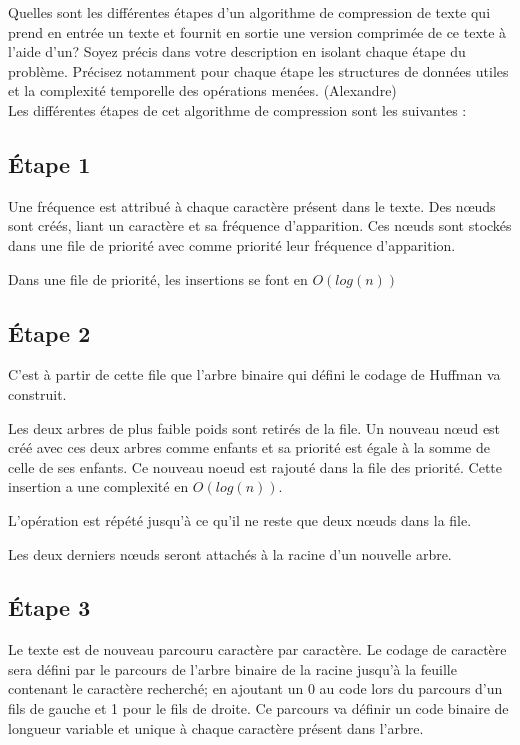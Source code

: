  Quelles sont les différentes étapes d’un algorithme de compression de texte qui
prend en entrée un texte et fournit en sortie une version comprimée de ce texte à
l’aide d’un? Soyez précis dans votre description en isolant
chaque étape du problème. Précisez notamment pour chaque étape les structures
de données utiles et la complexité temporelle des opérations menées. (Alexandre)\\



Les différentes étapes de cet algorithme de compression sont les suivantes :
\subsection*{Étape 1}
Une fréquence est attribué à chaque caractère présent dans le texte. Des nœuds sont créés, liant un caractère et sa fréquence d'apparition. Ces nœuds sont stockés dans une file de priorité avec comme priorité leur fréquence d'apparition.

Dans une file de priorité, les insertions se font en $O(log(n))$

\subsection*{Étape 2}

C'est à partir de cette file que l'arbre binaire qui défini le codage de Huffman va construit.

Les deux arbres de plus faible poids sont retirés de la file. Un nouveau nœud est créé avec ces deux arbres comme enfants et sa priorité est égale à la somme de celle de ses enfants. Ce nouveau noeud est rajouté dans la file des priorité. Cette insertion a une complexité en $O(log(n))$.

L'opération est répété jusqu'à ce qu'il ne reste que deux nœuds dans la file.

Les deux derniers nœuds seront attachés à la racine d'un nouvelle arbre.

\subsection*{Étape 3}

Le texte est de nouveau parcouru caractère par caractère. Le codage de caractère sera défini par le parcours de l'arbre binaire de la racine jusqu'à la feuille contenant le caractère recherché; en ajoutant un 0 au code lors du parcours d'un fils de gauche et 1 pour le fils de droite. Ce parcours va définir un code binaire de longueur variable et unique à chaque caractère présent dans l'arbre.